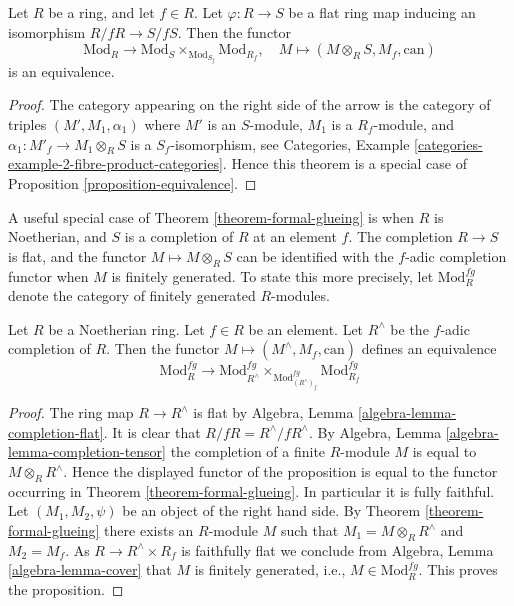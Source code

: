 \begin{theorem}
\label{theorem-formal-glueing}
Let $R$ be a ring, and let $f \in R$.
Let $\varphi : R \to S$ be a flat ring map inducing an isomorphism
$R/fR \to S/fS$. Then the functor
$$
\text{Mod}_R
\longrightarrow
\text{Mod}_S \times_{\text{Mod}_{S_f}} \text{Mod}_{R_f},
\quad
M
\longmapsto
(M \otimes_R S, M_f, \text{can})
$$
is an equivalence.
\end{theorem}

\begin{proof}
The category appearing on the right side of the arrow
is the category of triples $(M', M_1, \alpha_1)$ where $M'$ is an
$S$-module, $M_1$ is a $R_f$-module, and
$\alpha_1 : M'_f \to M_1 \otimes_R S$ is a $S_f$-isomorphism, see
Categories, Example \ref{categories-example-2-fibre-product-categories}.
Hence this theorem is a special case of
Proposition \ref{proposition-equivalence}.
\end{proof}

\noindent
A useful special case of
Theorem \ref{theorem-formal-glueing}
is when $R$ is Noetherian, and $S$ is a completion of $R$ at an
element $f$. The completion $R \to S$ is flat, and the functor
$M \mapsto M \otimes_R S$ can be identified with the $f$-adic
completion functor when $M$ is finitely generated. To state
this more precisely, let $\text{Mod}^{fg}_R$ denote the category
of finitely generated $R$-modules.

\begin{proposition}
\label{proposition-formal-glueing}
Let $R$ be a Noetherian ring.
Let $f \in R$ be an element.
Let $R^\wedge$ be the $f$-adic completion of $R$.
Then the functor $M \mapsto (M^\wedge, M_f, \text{can})$
defines an equivalence
$$
\text{Mod}^{fg}_R
\longrightarrow
\text{Mod}^{fg}_{R^\wedge}
\times_{\text{Mod}^{fg}_{(R^\wedge)_f}}
\text{Mod}^{fg}_{R_f}
$$
\end{proposition}

\begin{proof}
The ring map $R \to R^\wedge$ is flat by
Algebra, Lemma \ref{algebra-lemma-completion-flat}.
It is clear that $R/fR = R^\wedge/fR^\wedge$.
By
Algebra, Lemma \ref{algebra-lemma-completion-tensor}
the completion of a finite $R$-module $M$ is equal to $M \otimes_R R^\wedge$.
Hence the displayed functor of the proposition is equal to the
functor occurring in
Theorem \ref{theorem-formal-glueing}.
In particular it is fully faithful. Let $(M_1, M_2, \psi)$ be an
object of the right hand side. By
Theorem \ref{theorem-formal-glueing}
there exists an $R$-module $M$ such that
$M_1 = M \otimes_R R^\wedge$ and $M_2 = M_f$. As $R \to R^\wedge \times R_f$
is faithfully flat we conclude from
Algebra, Lemma \ref{algebra-lemma-cover}
that $M$ is finitely generated, i.e., $M \in \text{Mod}^{fg}_R$.
This proves the proposition.
\end{proof}

